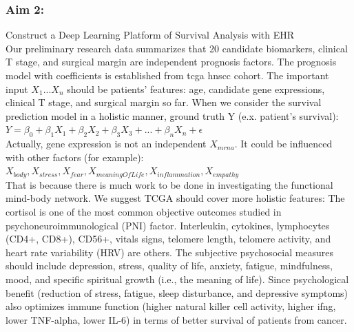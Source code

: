 \documentclass[12pt, a4paper]{article}
\begin{document}

\clearpage


\subsubsection*{Aim 2:} Construct a Deep Learning Platform of Survival Analysis with EHR\\[0.5cm]



Our preliminary research data summarizes that 20 candidate biomarkers, clinical T stage, and surgical margin are independent prognosis factors.
The prognosis model with coefficients is established from \acrshort{tcga} \acrshort{hnscc} cohort. The important input $X_1...X_n$ should be patients' features: age, candidate gene expressions, clinical T stage, and surgical margin so far.
When we consider the survival prediction model in a holistic manner,
ground truth Y (e.x. patient's survival):\\[0.5cm]
$Y = \beta_0 + \beta_1 X_1 + \beta_2 X_2 + \beta_3 X_3 + ... + \beta_n X_n + \epsilon$\\[0.3cm]
Actually, gene expression is not an independent $X_{mrna}$. It could be influenced with other factors (for example):\\[0.3cm]
$X_{body}, X_{stress}, X_{fear}, X_{meaningOfLife}, X_{inflammation}, X_{empathy}$\\[0.3cm]
That is because there is much work to be done in investigating the functional mind-body network\citep{Rogers1959}.
We suggest TCGA should cover more holistic features:
The cortisol is one of the most common objective outcomes studied in psychoneuroimmunological (PNI) factor. Interleukin, cytokines, lymphocytes (CD4+, CD8+), CD56+, vitals signs, telomere length, telomere activity, and heart rate variability (HRV) are others.
The subjective psychosocial measures should include depression, stress, quality of life, anxiety, fatigue, mindfulness, mood, and specific spiritual growth (i.e., the meaning of life)\citep{Hsiao2012}.
Since psychological benefit (reduction of stress, fatigue, sleep disturbance, and depressive symptoms) also optimizes immune function (higher natural killer cell activity, higher \acrshort{ifng}, lower TNF-alpha, lower IL-6) in terms of better survival of patients from cancer.
\end{document}
